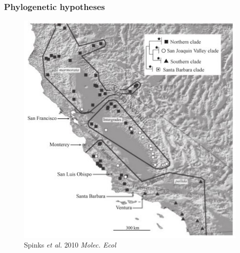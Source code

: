 \documentclass{beamer}\usepackage{graphicx, color}
\begin{document}
\begin{frame}
  \frametitle{Phylogenetic hypotheses}

  \begin{figure}[h]
    \centering
    \captionsetup{justification = raggedleft, slc = off}
    \includegraphics[height = 0.8\textheight, keepaspectratio = true]{figure/spinks10}
    \caption*{\scriptsize{Spinks \textit{et al.} 2010 \textit{Molec. Ecol}}}
    \label{fig:spinks}
  \end{figure}
 
\end{frame}
\end{document}
